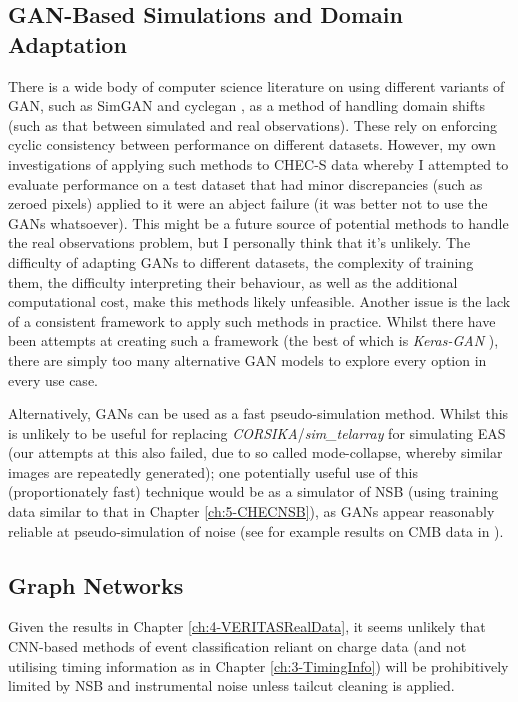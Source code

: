 \subsection{GAN-Based Simulations and Domain Adaptation}
There is a wide body of computer science literature on using different variants of GAN, such as SimGAN \cite{simgan} and cyclegan \cite{cyclegan}, as a method of handling domain shifts (such as that between simulated and real observations). These rely on enforcing cyclic consistency between performance on different datasets. However, my own investigations of applying such methods to CHEC-S data whereby I attempted to evaluate performance on a test dataset that had minor discrepancies (such as zeroed pixels) applied to it were an abject failure (it was better not to use the GANs whatsoever). This might be a future source of potential methods to handle the real observations problem, but I personally think that it's unlikely. The difficulty of adapting GANs to different datasets, the complexity of training them, the difficulty interpreting their behaviour, as well as the additional computational cost, make this methods likely unfeasible. Another issue is the lack of a consistent framework to apply such methods in practice. Whilst there have been attempts at creating such a framework (the best of which is \textit{Keras-GAN} \cite{kerasgan}), there are simply too many alternative GAN models to explore every option in every use case. 

Alternatively, GANs can be used as a fast pseudo-simulation method. Whilst this is unlikely to be useful for replacing \textit{CORSIKA}/\textit{sim\_telarray} for simulating EAS (our attempts at this also failed, due to so called mode-collapse, whereby similar images are repeatedly generated); one potentially useful use of this (proportionately fast) technique would be as a simulator of NSB (using training data similar to that in Chapter \ref{ch:5-CHECNSB}), as GANs appear reasonably reliable at pseudo-simulation of noise (see for example results on CMB data in \cite{darshgan}). 

\subsection{Graph Networks}
Given the results in Chapter \ref{ch:4-VERITASRealData}, it seems unlikely that CNN-based methods of event classification reliant on charge data (and not utilising timing information as in Chapter \ref{ch:3-TimingInfo}) will be prohibitively limited by NSB and instrumental noise unless tailcut cleaning is applied.

